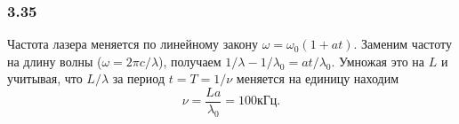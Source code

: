 \subsubsection*{3.35}
Частота лазера меняется по линейному закону $\omega = \omega_0(1 + at)$. Заменим частоту на длину волны ($\omega = 2\pi c / \lambda$), получаем $1/\lambda - 1/\lambda_0 = at/\lambda_0$. Умножая это на $L$ и учитывая, что $L/\lambda$ за период $t =T = 1/\nu$ меняется на единицу находим 
\begin{equation*}
	\nu = \frac{La}{\lambda_0} = 100 кГц.
\end{equation*}